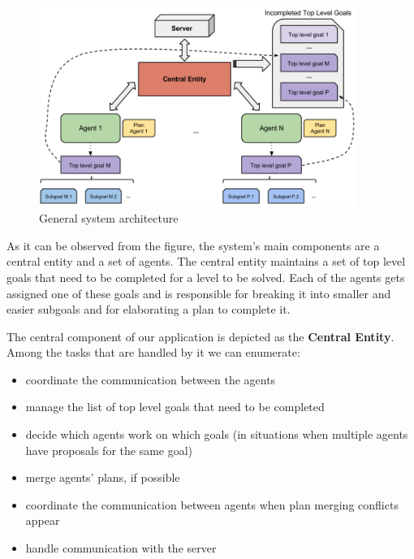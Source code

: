 \begin{figure}[htb]
\begin{center}
 \includegraphics[width=0.92\textwidth]{figures/architecture.png}
 \caption{General system architecture}
 \label{fig:architecture}
\end{center}
\end{figure}

As it can be observed from the figure, the system's main components are a central entity and a set of agents.
The central entity maintains a set of top level goals that need to be completed for a level to be solved. Each
of the agents gets assigned one of these goals and is responsible for breaking it into smaller and easier
subgoals and for elaborating a plan to complete it.

The central component of our application is depicted as the \textbf{Central Entity}. Among the tasks that are
handled by it we can enumerate:

\vspace{-12pt}
\begin{itemize}
\setlength{\itemsep}{0cm}
\item coordinate the communication between the agents
\item manage the list of top level goals that need to be completed
\item decide which agents work on which goals (in situations when multiple agents have proposals for the same goal)
\item merge agents' plans, if possible
\item coordinate the communication between agents when plan merging conflicts appear
\item handle communication with the server
\end{itemize}
\vspace{-0.3cm}

